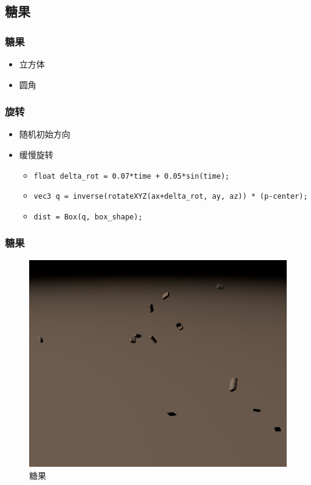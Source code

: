 \documentclass[aspectratio=169]{ctexbeamer} %
\begin{document}
\subsection{糖果}
\begin{frame}
    \frametitle{糖果}
    \begin{itemize}
        \item 立方体
        \item 圆角
    \end{itemize}
\end{frame}
\begin{frame}
    \frametitle{旋转}
    \begin{itemize}[<+->]
        \item 随机初始方向
        \item 缓慢旋转
        \begin{itemize}
            \item \texttt{float delta\_rot = 0.07*time + 0.05*sin(time);}
            \item \texttt{vec3 q = inverse(rotateXYZ(ax+delta\_rot, ay, az)) * (p-center);}
            \item \texttt{dist = Box(q, box\_shape);}
        \end{itemize}
    \end{itemize}
\end{frame}
\begin{frame}
    \frametitle{糖果}
    \begin{figure}[htbp]
        \centering
        \includegraphics[height=.75\textheight]{images/pre/candies.pdf}
        \caption{糖果}
        \label{fig:candies}
    \end{figure}
\end{frame}
\end{document}
